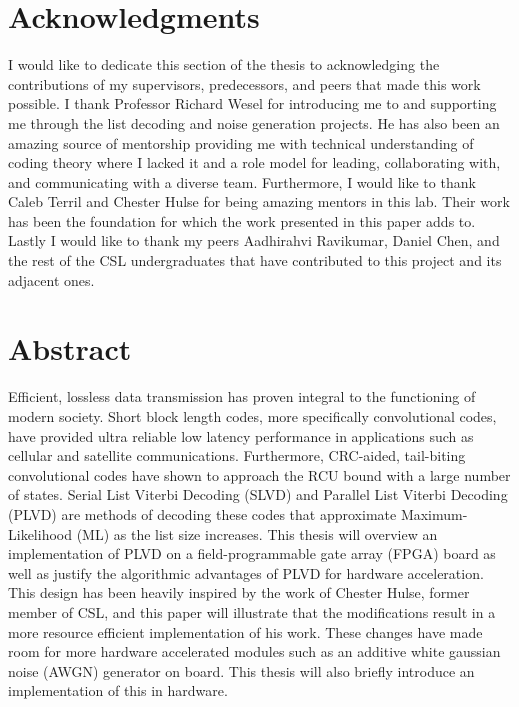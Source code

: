 


\chapter*{Acknowledgments}

I would like to dedicate this section of the thesis to acknowledging the contributions of my supervisors, predecessors, and peers that made this work possible. I thank Professor Richard Wesel for introducing me to and supporting me through the list decoding and noise generation projects. He has also been an amazing source of mentorship providing me with technical understanding of coding theory where I lacked it and a role model for leading, collaborating with, and communicating with a diverse team. Furthermore, I would like to thank Caleb Terril and Chester Hulse for being amazing mentors in this lab. Their work has been the foundation for which the work presented in this paper adds to. Lastly I would like to thank my peers Aadhirahvi Ravikumar, Daniel Chen, and the rest of the CSL undergraduates that have contributed to this project and its adjacent ones. 

\clearpage


\chapter*{Abstract}

Efficient, lossless data transmission has proven integral to the functioning of modern society. Short block length codes, more specifically convolutional codes, have provided ultra reliable low latency performance in applications such as cellular and satellite communications. Furthermore, CRC-aided, tail-biting convolutional codes have shown to approach the RCU bound with a large number of states. Serial List Viterbi Decoding (SLVD) and Parallel List Viterbi Decoding (PLVD) are methods of decoding these codes that approximate Maximum-Likelihood (ML) as the list size increases. This thesis will overview an implementation of PLVD on a field-programmable gate array (FPGA) board as well as justify the algorithmic advantages of PLVD for hardware acceleration. This design has been heavily inspired by the work of Chester Hulse, former member of CSL, and this paper will illustrate that the modifications result in a more resource efficient implementation of his work. These changes have made room for more hardware accelerated modules such as an additive white gaussian noise (AWGN) generator on board. This thesis will also briefly introduce an implementation of this in hardware.

